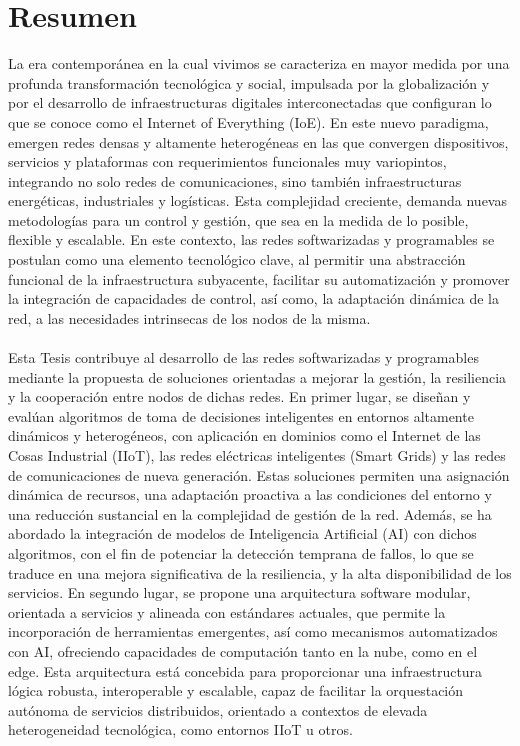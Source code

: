 \clearemptydoublepage %



\chapter{Resumen}

La era contemporánea en la cual vivimos se caracteriza en mayor medida por una profunda transformación tecnológica y social, impulsada por la globalización y por el desarrollo de infraestructuras digitales interconectadas que configuran lo que se conoce como el Internet of Everything (IoE). En este nuevo paradigma, emergen redes densas y altamente heterogéneas en las que convergen dispositivos, servicios y plataformas con requerimientos funcionales muy variopintos, integrando no solo redes de comunicaciones, sino también infraestructuras energéticas, industriales y logísticas. Esta complejidad creciente, demanda nuevas metodologías para un control y gestión, que sea en la medida de lo posible, flexible y escalable. En este contexto, las redes softwarizadas y programables se postulan como una elemento tecnológico clave, al permitir una abstracción funcional de la infraestructura subyacente, facilitar su automatización y promover la integración de capacidades de control, así como, la adaptación dinámica de la red, a las necesidades intrinsecas de los nodos de la misma.\\
\\
Esta Tesis contribuye al desarrollo de las redes softwarizadas y programables mediante la propuesta de soluciones orientadas a mejorar la gestión, la resiliencia y la cooperación entre nodos de dichas redes. En primer lugar, se diseñan y evalúan algoritmos de toma de decisiones inteligentes en entornos altamente dinámicos y heterogéneos, con aplicación en dominios como el Internet de las Cosas Industrial (IIoT), las redes eléctricas inteligentes (Smart Grids) y las redes de comunicaciones de nueva generación. Estas soluciones permiten una asignación dinámica de recursos, una adaptación proactiva a las condiciones del entorno y una reducción sustancial en la complejidad de gestión de la red. Además, se ha abordado la integración de modelos de Inteligencia Artificial (AI) con dichos algoritmos, con el fin de potenciar la detección temprana de fallos, lo que se traduce en una mejora significativa de la resiliencia, y la alta disponibilidad de los servicios. En segundo lugar, se propone una arquitectura software modular, orientada a servicios y alineada con estándares actuales, que permite la incorporación de herramientas emergentes, así como mecanismos automatizados con AI, ofreciendo capacidades  de computación tanto en la nube, como en el edge. Esta arquitectura está concebida para proporcionar una infraestructura lógica robusta, interoperable y escalable, capaz de facilitar la orquestación autónoma de servicios distribuidos, orientado a contextos de elevada heterogeneidad tecnológica, como entornos IIoT u otros.

